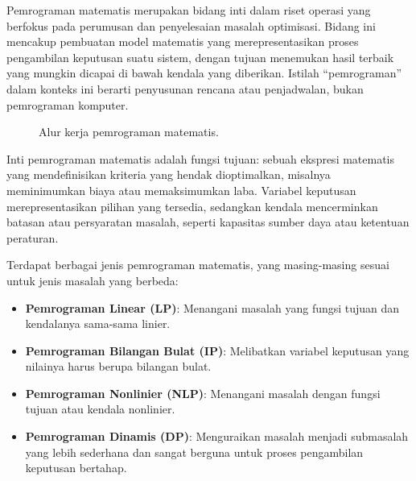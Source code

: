 Pemrograman matematis merupakan bidang inti dalam riset operasi yang berfokus pada perumusan dan penyelesaian masalah optimisasi. Bidang ini mencakup pembuatan model matematis yang merepresentasikan proses pengambilan keputusan suatu sistem, dengan tujuan menemukan hasil terbaik yang mungkin dicapai di bawah kendala yang diberikan. Istilah ``pemrograman'' dalam konteks ini berarti penyusunan rencana atau penjadwalan, bukan pemrograman komputer.

\begin{figure}[htbp]
\centering
{}
\caption{Alur kerja pemrograman matematis.}
\label{fig:mp-pipeline}
\end{figure}
Inti pemrograman matematis adalah fungsi tujuan: sebuah ekspresi matematis yang mendefinisikan kriteria yang hendak dioptimalkan, misalnya meminimumkan biaya atau memaksimumkan laba. Variabel keputusan merepresentasikan pilihan yang tersedia, sedangkan kendala mencerminkan batasan atau persyaratan masalah, seperti kapasitas sumber daya atau ketentuan peraturan.

Terdapat berbagai jenis pemrograman matematis, yang masing-masing sesuai untuk jenis masalah yang berbeda:

\begin{itemize}
    \item \textbf{Pemrograman Linear (LP)}: Menangani masalah yang fungsi tujuan dan kendalanya sama-sama linier.
    \item \textbf{Pemrograman Bilangan Bulat (IP)}: Melibatkan variabel keputusan yang nilainya harus berupa bilangan bulat.
    \item \textbf{Pemrograman Nonlinier (NLP)}: Menangani masalah dengan fungsi tujuan atau kendala nonlinier.
    \item \textbf{Pemrograman Dinamis (DP)}: Menguraikan masalah menjadi submasalah yang lebih sederhana dan sangat berguna untuk proses pengambilan keputusan bertahap.
\end{itemize}

